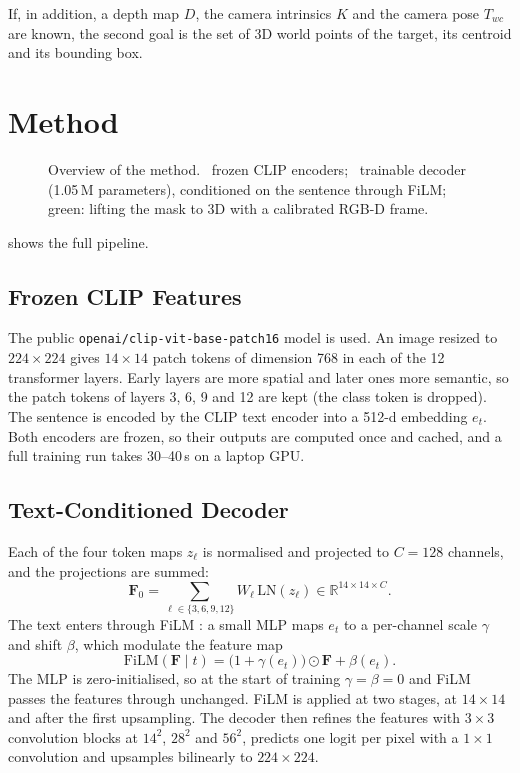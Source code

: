 \documentclass[conference,a4paper]{IEEEtran}
\newcommand{\Ffeat}{\mathbf{F}}
\newcommand{\film}{\mathrm{FiLM}}
\begin{document}
If, in addition, a depth map $D$, the camera intrinsics $K$ and the camera pose $T_{wc}$ are known,
the second goal is the set of 3D world points of the target, its centroid and its bounding box.

\section{Method}
\label{sec:method}

\begin{figure}[t]
\centering
\resizebox{\textwidth}{!}{}
\caption{Overview of the method. \textcolor{blue!55!cyan}{\faSnowflake}~frozen CLIP encoders;
\textcolor{orange!85!red}{\faFire}~trainable decoder (1.05\,M parameters), conditioned on the sentence
through FiLM; green: lifting the mask to 3D with a calibrated RGB-D frame.}
\label{fig:pipeline}
\end{figure}

 shows the full pipeline.

\subsection{Frozen CLIP Features}

The public \texttt{openai/clip-vit-base-patch16} model is used. An image resized to $224\times224$
gives $14\times14$ patch tokens of dimension 768 in each of the 12 transformer layers. Early layers
are more spatial and later ones more semantic, so the patch tokens of layers 3, 6, 9 and 12
are kept (the class token is dropped). The sentence is encoded by the CLIP text encoder into a 512-d
embedding $e_t$. Both encoders are frozen, so their outputs are computed once and cached, and a full
training run takes 30--40\,s on a laptop GPU.

\subsection{Text-Conditioned Decoder}

Each of the four token maps $z_\ell$ is normalised and projected to $C = 128$ channels, and the
projections are summed:
\begin{equation}
\Ffeat_0 = \sum_{\ell \in \{3,6,9,12\}} W_\ell \, \mathrm{LN}(z_\ell) \in \mathbb{R}^{14\times14\times C}.
\end{equation}
The text enters through FiLM \cite{perez2018film}: a small MLP maps $e_t$ to a per-channel scale
$\gamma$ and shift $\beta$, which modulate the feature map
\begin{equation}
\film(\Ffeat \mid t) = \bigl(1 + \gamma(e_t)\bigr) \odot \Ffeat + \beta(e_t).
\label{eq:film}
\end{equation}
The MLP is zero-initialised, so at the start of training $\gamma = \beta = 0$ and FiLM passes the
features through unchanged. FiLM is applied at two stages,
at $14\times14$ and after the first upsampling. The decoder then refines the features with
$3\times3$ convolution blocks at $14^2$, $28^2$ and $56^2$, predicts one logit per pixel with a
$1\times1$ convolution and upsamples bilinearly to $224\times224$.
\end{document}

